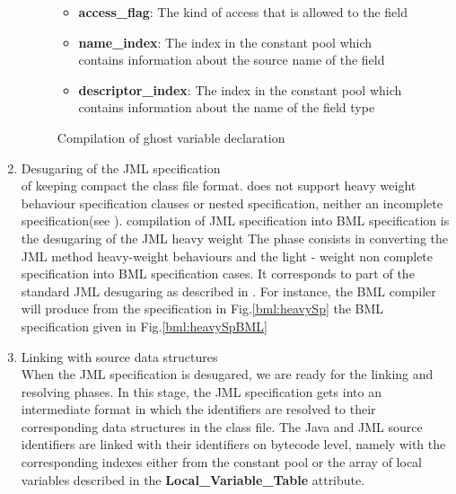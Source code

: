 \begin{enumerate}
\begin{figure}[t]
\begin{itemize}
\item \textbf{access\_flag}: The kind of access that is allowed to the field

\item \textbf{name\_index}:  The index in the constant pool which contains information about the source name of the field

\item \textbf{descriptor\_index}: The index in the constant pool which contains information about the name of the field type  
\end{itemize}


\caption{\sc Compilation of ghost variable declaration}
\label{bml:compiler:ghost}
\end{figure}

\item Desugaring of the JML specification \\
      of keeping compact the class file format.  %
      does not support heavy weight behaviour specification clauses or
      nested specification, neither an incomplete %
      specification(see \cite{JMLRefMan}).  %
      compilation of JML specification into BML specification is the
      desugaring of the JML heavy weight The phase consists in
      converting the JML method heavy-weight behaviours and the light
      - weight non complete specification into BML specification
      cases.  It corresponds to part of the standard JML desugaring as
      described in \cite{RT03djml}.  For instance, the BML compiler
      will produce from the specification in Fig.\ref{bml:heavySp} the
      BML specification given in Fig.\ref{bml:heavySpBML}
      



\item Linking with source data structures \\
      When the JML specification is desugared, we are ready for the
      linking and resolving phases.  In this stage, the JML
      specification gets into an intermediate format in which the
      identifiers are resolved to their corresponding data structures
      in the class file.  The Java and JML source identifiers are
      linked with their identifiers on bytecode level, namely with the
      corresponding indexes either from the constant pool or the array
      of local variables described in the
      \textbf{Local\_Variable\_Table} attribute.


\end{enumerate}

